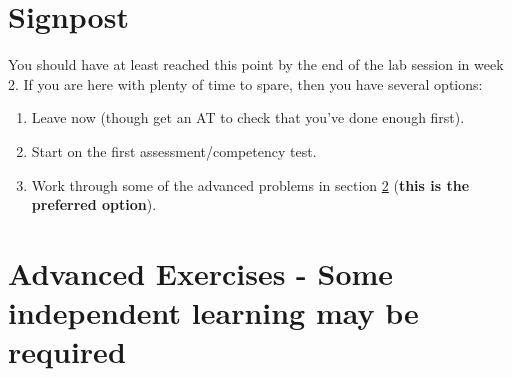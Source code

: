 \section {Signpost} 

You should have at least reached this point by the end of the lab session in week 2. If you are here with plenty of time to spare, then you have several options:

\begin{enumerate}
    \item Leave now (though get an AT to check that you've done enough first).
    \item Start on the first assessment/competency test.
    \item Work through some of the advanced problems in section \ref{firstadvanced} (\textbf{this is the preferred option}).
\end{enumerate}

\newpage
\section{Advanced Exercises - Some independent learning may be required}
\label{firstadvanced}

